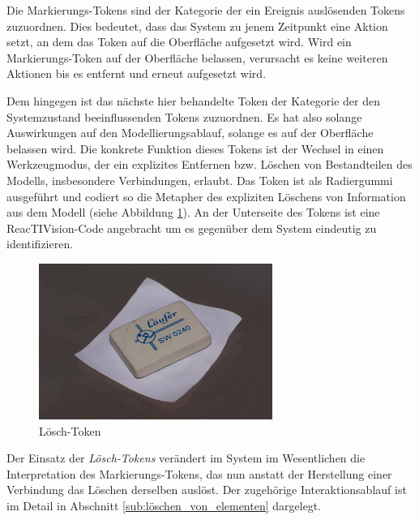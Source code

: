 Die Markierungs-Tokens sind der Kategorie der ein Ereignis auslösenden Tokens zuzuordnen. Dies bedeutet, dass das System zu jenem Zeitpunkt eine Aktion setzt, an dem das Token auf die Oberfläche aufgesetzt wird. Wird ein Markierungs-Token auf der Oberfläche belassen, verursacht es keine weiteren Aktionen bis es entfernt und erneut aufgesetzt wird.

Dem hingegen ist das nächste hier behandelte Token der Kategorie der den Systemzustand beeinflussenden Tokens zuzuordnen. Es hat also solange Auswirkungen auf den Modellierungsablauf, solange es auf der Oberfläche belassen wird. Die konkrete Funktion dieses Tokens ist der Wechsel in einen Werkzeugmodus, der ein explizites Entfernen bzw. Löschen von Bestandteilen des Modells, insbesondere Verbindungen, erlaubt. Das Token ist als Radiergummi ausgeführt und codiert so die Metapher des expliziten Löschens von Information aus dem Modell (siehe Abbildung \ref{fig:img_SystemNeu_Loeschtoken}). An der Unterseite des Tokens ist eine ReacTIVision-Code angebracht um es gegenüber dem System eindeutig zu identifizieren.

\begin{figure}[htbp]
	\centering
		\includegraphics[height=2in]{img/SystemNeu/Loeschtoken.jpg}
	\caption{Lösch-Token}
	\label{fig:img_SystemNeu_Loeschtoken}
\end{figure}


Der Einsatz der \emph{Lösch-Tokens} verändert im System im Wesentlichen die Interpretation des Markierungs-Tokens, das nun anstatt der Herstellung einer Verbindung das Löschen derselben auslöst. Der  zugehörige Interaktionsablauf ist im Detail in Abschnitt \ref{sub:löschen_von_elementen} dargelegt.

